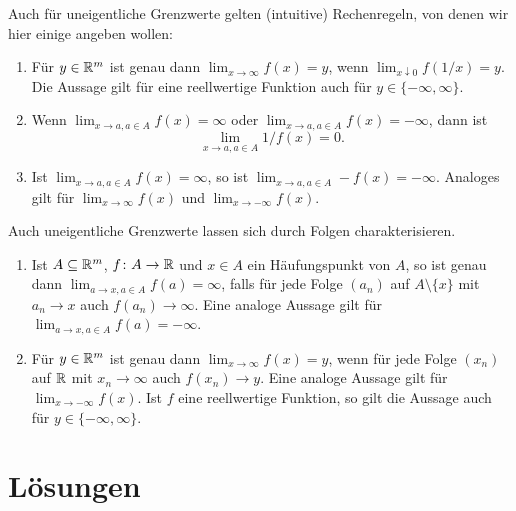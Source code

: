 \documentclass[a4paper,10pt]{article}
\begin{document}
Auch für uneigentliche Grenzwerte gelten (intuitive) Rechenregeln, von denen wir hier einige angeben wollen:
\begin{enumerate}
 \item
  Für $y \in \mathbb{R}^m$ ist genau dann $\lim_{x \to \infty} f(x) = y$, wenn $\lim_{x \downarrow 0} f(1/x) = y$. Die Aussage gilt für eine reellwertige Funktion auch für $y \in \{-\infty, \infty\}$.
 \item
  Wenn $\lim_{x \to a, a \in A} f(x) = \infty$ oder $\lim_{x \to a, a \in A} f(x) = -\infty$, dann ist
  \[
   \lim_{x \to a, a \in A} 1/f(x) = 0.
  \]
 \item
  Ist $\lim_{x \to a, a \in A} f(x) = \infty$, so ist $\lim_{x \to a, a \in A} -f(x) = -\infty$. Analoges gilt für $\lim_{x \to \infty} f(x)$ und $\lim_{x \to -\infty} f(x)$.
\end{enumerate}


Auch uneigentliche Grenzwerte lassen sich durch Folgen charakterisieren.


\begin{enumerate}[resume]
 \item
  Ist $A \subseteq \mathbb{R}^m$, $f \colon A \to \mathbb{R}$ und $x \in A$ ein Häufungspunkt von $A$, so ist genau dann $\lim_{a \to x, a \in A} f(a) = \infty$, falls für jede Folge $(a_n)$ auf $A \setminus \{x\}$ mit $a_n \to x$ auch $f(a_n) \to \infty$. Eine analoge Aussage gilt für $\lim_{a \to x, a \in A} f(a) = -\infty$.
 \item
  Für $y \in \mathbb{R}^m$ ist genau dann $\lim_{x \to \infty} f(x) = y$, wenn für jede Folge $(x_n)$ auf $\mathbb{R}$ mit $x_n \to \infty$ auch $f(x_n) \to y$. Eine analoge Aussage gilt für $\lim_{x \to -\infty} f(x)$. Ist $f$ eine reellwertige Funktion, so gilt die Aussage auch für $y \in \{-\infty, \infty\}$.
\end{enumerate}









\newpage


\section{Lösungen}


\printsolutions
\end{document}
